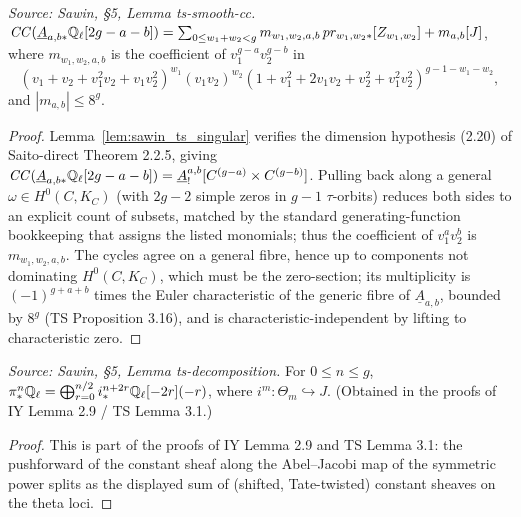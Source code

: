 \begin{lemma}
  \label{lem:sawin_ts_smooth_cc}
  \textit{Source: Sawin, §5, Lemma ts-smooth-cc.}
  $\mathit{CC}(\underline A_{a,b*}\mathbb{Q}_\ell[2g-a-b]) = \sum_{0\le w_1+w_2<g}
  m_{w_1,w_2,a,b}\,pr_{w_1,w_2*}[Z_{w_1,w_2}] + m_{a,b}[J]$, where
  $m_{w_1,w_2,a,b}$ is the coefficient of $v_1^{g-a}v_2^{g-b}$ in
  \[ (v_1+v_2+v_1^2v_2+v_1v_2^2)^{w_1}(v_1v_2)^{w_2}
     (1+v_1^2+2v_1v_2+v_2^2+v_1^2v_2^2)^{g-1-w_1-w_2}, \]
  and $|m_{a,b}|\le 8^g$.
\end{lemma}
\begin{proof}
  Lemma~\ref{lem:sawin_ts_singular} verifies the dimension hypothesis (2.20) of
  Saito-direct Theorem 2.2.5, giving $\mathit{CC}(\underline A_{a,b*}\mathbb{Q}_\ell[2g-a-b]) =
  \underline A^{a,b}_![C^{(g-a)}\times C^{(g-b)}]$.  Pulling back along a general
  $\omega\in H^0(C,K_C)$ (with $2g-2$ simple zeros in $g-1$ $\tau$-orbits) reduces
  both sides to an explicit count of subsets, matched by the standard
  generating-function bookkeeping that assigns the listed monomials; thus the
  coefficient of $v_1^av_2^b$ is $m_{w_1,w_2,a,b}$.  The cycles agree on a general
  fibre, hence up to components not dominating $H^0(C,K_C)$, which must be the
  zero-section; its multiplicity is $(-1)^{g+a+b}$ times the Euler characteristic
  of the generic fibre of $\underline A_{a,b}$, bounded by $8^g$ (TS Proposition
  3.16), and is characteristic-independent by lifting to characteristic zero.
\end{proof}

\begin{lemma}
  \label{lem:sawin_ts_decomposition}
  \textit{Source: Sawin, §5, Lemma ts-decomposition.}
  For $0\le n\le g$, $\pi^n_*\mathbb{Q}_\ell = \bigoplus_{r=0}^{n/2}
  i^{n+2r}_*\mathbb{Q}_\ell[-2r](-r)$, where $i^m:\Theta_m\hookrightarrow J$.  (Obtained
  in the proofs of IY Lemma 2.9 / TS Lemma 3.1.)
\end{lemma}
\begin{proof}
  This is part of the proofs of IY Lemma 2.9 and TS Lemma 3.1: the pushforward of
  the constant sheaf along the Abel--Jacobi map of the symmetric power splits as
  the displayed sum of (shifted, Tate-twisted) constant sheaves on the theta loci.
\end{proof}

